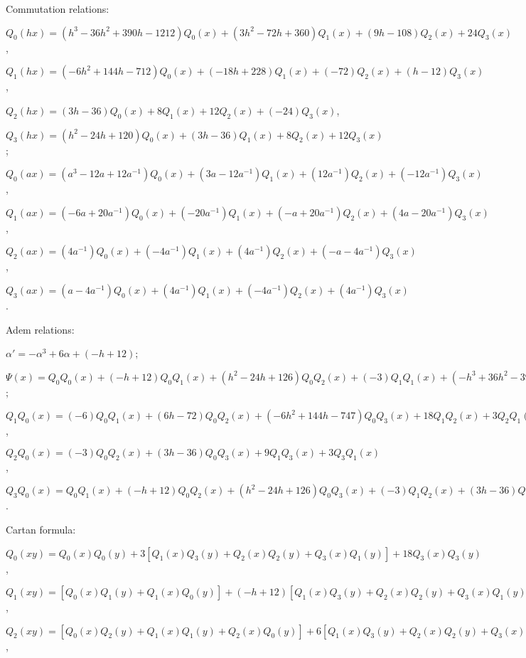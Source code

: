 \documentclass[12pt]{article}
\theoremstyle{definition}
\theoremstyle{remark}
\begin{document}
Commutation relations: 

$Q_0(h x) = (h^3 - 36 h^2 + 390 h - 1212) Q_0(x) + (3 h^2 - 72 h + 360) Q_1(x) + (9 h - 108) Q_2(x) + 24 Q_3(x)$, 

$Q_1(h x) = (-6 h^2 + 144 h - 712) Q_0(x) + (-18 h + 228) Q_1(x) + (-72) Q_2(x) + (h - 12) Q_3(x)$, 

$Q_2(h x) = (3 h - 36) Q_0(x) + 8 Q_1(x) + 12 Q_2(x) + (-24) Q_3(x)$, 

$Q_3(h x) = (h^2 - 24 h + 120) Q_0(x) + (3 h - 36) Q_1(x) + 8 Q_2(x) + 12 Q_3(x)$; 

$Q_0(a x) = (a^3 - 12 a + 12 a^{-1}) Q_0(x) + (3 a - 12 a^{-1}) Q_1(x) + (12 a^{-1}) Q_2(x) + (-12 a^{-1}) Q_3(x)$, 

$Q_1(a x) = (-6 a + 20 a^{-1}) Q_0(x) + (-20 a^{-1}) Q_1(x) + (- a + 20 a^{-1}) Q_2(x) + (4 a - 20 a^{-1}) Q_3(x)$, 

$Q_2(a x) = (4 a^{-1}) Q_0(x) + (-4 a^{-1}) Q_1(x) + (4 a^{-1}) Q_2(x) + (- a - 4 a^{-1}) Q_3(x)$, 

$Q_3(a x) = (a - 4 a^{-1}) Q_0(x) + (4 a^{-1}) Q_1(x) + (-4 a^{-1}) Q_2(x) + (4 a^{-1}) Q_3(x)$.  

Adem relations: 

$\alpha' = -\alpha^3 + 6 \alpha + (-h + 12)$;

$\Psi(x) = Q_0Q_0(x) + (-h + 12) Q_0Q_1(x) + (h^2 - 24 h + 126) Q_0Q_2(x) + (-3) Q_1Q_1(x) + (-h^3 + 36 h^2 - 396 h + 1296) Q_0Q_3(x) + (3h - 36) Q_1Q_2(x) + (-3 h^2 + 72 h - 378) Q_1Q_3(x) + 9 Q_2Q_2(x) + (-9 h + 108) Q_2Q_3(x) + (-27) Q_3Q_3(x)$;

$Q_1Q_0(x) = (-6) Q_0Q_1(x) + (6 h - 72) Q_0Q_2(x) + (-6 h^2 + 144 h - 747) Q_0Q_3(x) + 18 Q_1Q_2(x) + 3 Q_2Q_1(x) + (-18 h + 216) Q_1Q_3(x) + (-54) Q_2Q_3(x) + (-9) Q_3Q_2(x)$, 

$Q_2Q_0(x) = (-3) Q_0Q_2(x) + (3 h - 36) Q_0Q_3(x) + 9 Q_1Q_3(x) + 3 Q_3Q_1(x)$, 

$Q_3Q_0(x) = Q_0Q_1(x) + (-h + 12) Q_0Q_2(x) + (h^2 - 24 h + 126) Q_0Q_3(x) + (-3) Q_1Q_2(x) + (3 h - 36) Q_1Q_3(x) + 9 Q_2Q_3(x)$.  

Cartan formula: 

$Q_0(xy) = Q_0(x) Q_0(y) + 3 [Q_1(x) Q_3(y) + Q_2(x) Q_2(y) + Q_3(x) Q_1(y)] + 18 Q_3(x) Q_3(y)$, 

$Q_1(xy) = [Q_0(x) Q_1(y) + Q_1(x) Q_0(y)] + (-h + 12) [Q_1(x) Q_3(y) + Q_2(x) Q_2(y) + Q_3(x) Q_1(y)] + 3 [Q_2(x) Q_3(y) + Q_3(x) Q_2(y)] + (-6h + 72) Q_3(x) Q_3(y)$, 

$Q_2(xy) = [Q_0(x) Q_2(y) + Q_1(x) Q_1(y) + Q_2(x) Q_0(y)] + 6 [Q_1(x) Q_3(y) + Q_2(x) Q_2(y) + Q_3(x) Q_1(y)] + (-h + 12) [Q_2(x) Q_3(y) + Q_3(x) Q_2(y)] + 39 Q_3(x) Q_3(y)$, 
\end{document}
